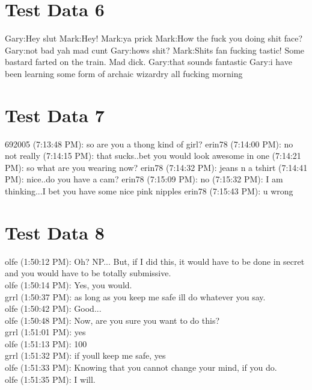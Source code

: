 \documentclass{article}
\begin{document}
\section*{Test Data 6}
Gary:Hey slut
\newline
Mark:Hey!
\newline
Mark:ya prick
\newline
Mark:How the fuck you doing shit face?
\newline
Gary:not bad yah mad cunt
\newline
Gary:hows shit?
\newline
Mark:Shits fan fucking tastic! Some bastard farted on the train. Mad dick.
\newline
Gary:that sounds fantastic
\newline
Gary:i have been learning some form of archaic wizardry all fucking morning
\section*{Test Data 7}
692005 (7:13:48 PM): so are you a thong kind of girl? 
\newline
erin78 (7:14:00 PM): no not really
 (7:14:15 PM): that sucks..bet you would look awesome in one
 (7:14:21 PM): so what are you wearing now?
\newline
erin78 (7:14:32 PM): jeans n a tshirt
 (7:14:41 PM): nice..do you have a cam?
\newline
erin78 (7:15:09 PM): no
 (7:15:32 PM): I am thinking...I bet you have some nice pink nipples
\newline
erin78 (7:15:43 PM): u wrong 

\section*{Test Data 8}
olfe (1:50:12 PM): Oh? NP... But, if I did this, it would have to be done in secret and you would have to be totally submissive.
\\
olfe (1:50:14 PM): Yes, you would.
\\
grrl (1:50:37 PM): as long as you keep me safe ill do whatever you say. 
\\
olfe (1:50:42 PM): Good...
\\
olfe (1:50:48 PM): Now, are you sure you want to do this?
\\
grrl (1:51:01 PM): yes
\\
olfe (1:51:13 PM): 100%
\\
grrl (1:51:32 PM): if youll keep me safe, yes
\\
olfe (1:51:33 PM): Knowing that you cannot change your mind, if you do. 
\\
olfe (1:51:35 PM): I will. 
\\
\\
\\
\end{document}
